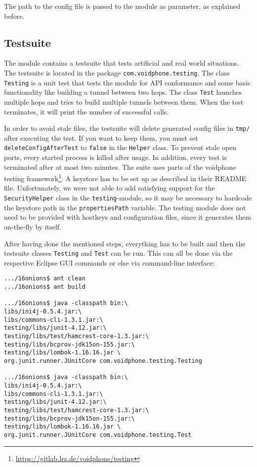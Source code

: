 \documentclass{article}
\begin{document}
The path to the config file is passed to the module as parameter, as explained before.
	
\subsection{Testsuite}
The module contains a testsuite that tests artificial and real world situations. The testsuite is
located in the package \texttt{com.voidphone.testing}. The class \texttt{Testing} is a unit test
that tests the module for API conformance and some basic functionality like building a tunnel
between two hops. The class \texttt{Test} launches multiple hops and tries to build multiple
tunnels between them. When the test terminates, it will print the number of successful calls.

In order to avoid stale files, the testsuite will delete generated config files in \texttt{tmp/}
after executing the test. If you want to keep them, you must set \texttt{deleteConfigAfterTest}
to \texttt{false} in the \texttt{Helper} class. To prevent stale open ports, every started process
is killed after usage. In addition, every test is terminated after at most two minutes.
The suite uses parts of the voidphone testing framework\footnote{\url{https://gitlab.lrz.de/voidphone/testing}}. A keystore has to be set up as described in their README file. Unfortunately, we were not able to add satisfying support for the \texttt{SecurityHelper} class in
the \texttt{testing}-module, so it may be necessary to hardcode the keystore path in the
\texttt{propertiesPath} variable.
The testing module does not need to be provided with hostkeys and configuration files, since it generates them on-the-fly by itself.

After having done the mentioned steps, everything has to be built and then the testsuite classes \texttt{Testing} and  \texttt{Test} can be run. This can all be done via the respective Eclipse GUI commands or else via command-line interface:

\begin{lstlisting}
.../16onions$ ant clean
.../16onions$ ant build

.../16onions$ java -classpath bin:\
libs/ini4j-0.5.4.jar:\
libs/commons-cli-1.3.1.jar:\
testing/libs/junit-4.12.jar:\
testing/libs/test/hamcrest-core-1.3.jar:\
testing/libs/bcprov-jdk15on-155.jar:\
testing/libs/lombok-1.16.16.jar \
org.junit.runner.JUnitCore com.voidphone.testing.Testing

.../16onions$ java -classpath bin:\
libs/ini4j-0.5.4.jar:\
libs/commons-cli-1.3.1.jar:\
testing/libs/junit-4.12.jar:\
testing/libs/test/hamcrest-core-1.3.jar:\
testing/libs/bcprov-jdk15on-155.jar:\
testing/libs/lombok-1.16.16.jar \
org.junit.runner.JUnitCore com.voidphone.testing.Test
\end{lstlisting}
\end{document}
